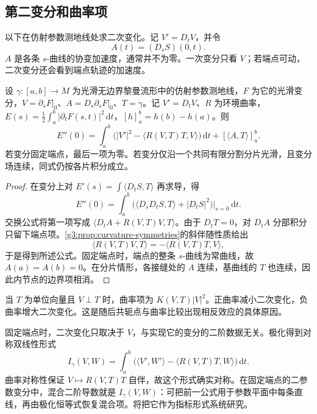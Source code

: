 \subsection{第二变分和曲率项}
\label{g3:subsec:0601:03}

以下在仿射参数测地线处求二次变化。记 \(V'=D_tV\)，并令
\[
	A(t)=(D_sS)(0,t).
\]
\(A\) 是各条 \(s\)-曲线的协变加速度，通常并不为零。一次变分只看 \(V\)；若端点可动，二次变分还会看到端点轨迹的加速度。

\begin{theorem}[能量第二变分]\label{g3:thm:energy-second-variation}
	设 \(\gamma:[a,b]\to M\) 为光滑无边界黎曼流形中的仿射参数测地线，\(F\) 为它的光滑变分，\(V=\partial_sF|_0\)、\(A=D_s\partial_sF|_0\)、\(T=\dot\gamma\)。记 \(V'=D_tV\)、\(R\) 为环境曲率，\(E(s)=\tfrac12\int_a^b|\partial_tF(s,t)|^2\,\mathrm dt\)，\([h]_a^b=h(b)-h(a)\)。则
	\begin{equation}\label{g3:eq:energy-second-variation}
		E''(0)=\int_a^b\bigl(|V'|^2-\langle R(V,T)T,V\rangle\bigr)\,\mathrm dt
		+[\langle A,T\rangle]_a^b.
	\end{equation}
	若变分固定端点，最后一项为零。若变分仅沿一个共同有限分割分片光滑，且变分场连续，同式仍按各片积分成立。
\end{theorem}
\begin{proof}
	在变分上对 \(E'(s)=\int\langle D_tS,T\rangle\) 再求导，得
	\[
		E''(0)=\int_a^b\bigl(\langle D_sD_tS,T\rangle+|D_tS|^2\bigr)\big|_{s=0}\,\mathrm dt.
	\]
	交换公式将第一项写成 \(\langle D_tA+R(V,T)V,T\rangle\)。由于 \(D_tT=0\)，对 \(D_tA\) 分部积分只留下端点项。\cref{g3:prop:curvature-symmetries}的斜伴随性质给出
	\[
		\langle R(V,T)V,T\rangle=-\langle R(V,T)T,V\rangle,
	\]
	于是得到所述公式。固定端点时，端点的整条 \(s\)-曲线为常曲线，故 \(A(a)=A(b)=0\)。在分片情形，各接缝处的 \(A\) 连续，基曲线的 \(T\) 也连续，因此内节点的边界项相消。
\end{proof}

当 \(T\) 为单位向量且 \(V\perp T\) 时，曲率项为 \(K(V,T)|V|^2\)。正曲率减小二次变化，负曲率增大二次变化。这是随后共轭点与曲率比较出现相反效应的具体原因。

\ProseParagraphBreak

固定端点时，二次变化只取决于 \(V\)，与实现它的变分的二阶数据无关。极化得到对称双线性形式
\begin{equation}\label{g3:eq:index-form-introduction}
	I_\gamma(V,W)=\int_a^b\bigl(\langle V',W'\rangle
	-\langle R(V,T)T,W\rangle\bigr)\,\mathrm dt.
\end{equation}
曲率对称性保证 \(V\mapsto R(V,T)T\) 自伴，故这个形式确实对称。在固定端点的二参数变分中，混合二阶导数就是 \(I_\gamma(V,W)\)：可把前一公式用于参数平面中每条直线，再由极化恒等式恢复混合项。将把它作为指标形式系统研究。

